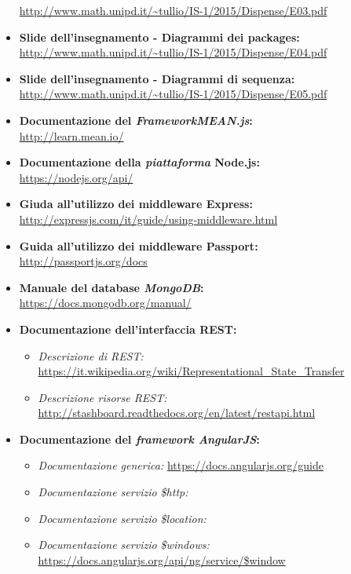 \begin{itemize}
		\url{http://www.math.unipd.it/~tullio/IS-1/2015/Dispense/E03.pdf}
	\item \textbf{Slide dell'insegnamento - Diagrammi dei packages:} \\
		\url{http://www.math.unipd.it/~tullio/IS-1/2015/Dispense/E04.pdf}
	\item \textbf{Slide dell'insegnamento - Diagrammi di sequenza:} \\
		\url{http://www.math.unipd.it/~tullio/IS-1/2015/Dispense/E05.pdf}
	\item \textbf{Documentazione del \textit{FrameworkMEAN.js}:} \\
		\url{http://learn.mean.io/}
	\item \textbf{Documentazione della \textit{piattaforma} Node.js:} \\
		\url{https://nodejs.org/api/}
	\item \textbf{Giuda all'utilizzo dei middleware Express:} \\
		\url{http://expressjs.com/it/guide/using-middleware.html}
	\item \textbf{Guida all'utilizzo dei middleware Passport:} \\
		\url{http://passportjs.org/docs}
	\item \textbf{Manuale del database \textit{MongoDB}:} \\
		\url{https://docs.mongodb.org/manual/}
	\item \textbf{Documentazione dell'interfaccia REST:}
		\begin{itemize}
			\item \textit{Descrizione di REST:} \url{https://it.wikipedia.org/wiki/Representational_State_Transfer}
			\item \textit{Descrizione risorse REST:} \url{http://stashboard.readthedocs.org/en/latest/restapi.html}
		\end{itemize}
	\item \textbf{Documentazione del \textit{framework AngularJS}:} \\
		\begin{itemize}
			\item \textit{Documentazione generica:} \url{https://docs.angularjs.org/guide}
			\item \textit{Documentazione servizio \$http:} 
			\item \textit{Documentazione servizio \$location:} 
			\item \textit{Documentazione servizio \$windows:} \url{https://docs.angularjs.org/api/ng/service/$window}

\end{itemize}
\end{itemize}
